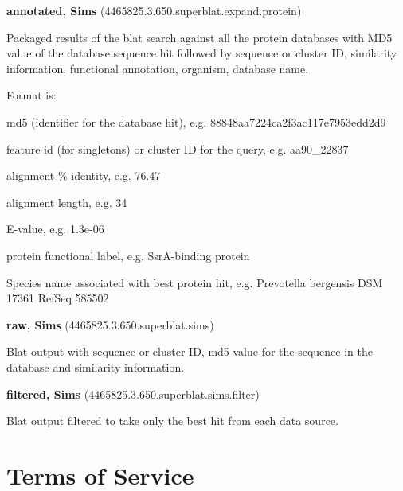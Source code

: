 \documentclass[12pt,fullpage]{report}
\begin{document}
\begin{appendices}
\begin{mdframed}
\textbf{annotated, Sims} (4465825.3.650.superblat.expand.protein)

Packaged results of the blat search against all the protein databases with \gls{MD5} value of the database sequence hit followed by sequence or cluster ID, similarity information, functional annotation, organism, database name.

Format is:

    md5 (identifier for the database hit), e.g. 88848aa7224ca2f3ac117e7953edd2d9

    feature id (for singletons) or cluster ID for the query, e.g. aa90\_22837

    alignment \% identity, e.g. 76.47

    alignment length, e.g. 34

    E-value, e.g. 1.3e-06

    protein functional label, e.g. SsrA-binding protein

    Species name associated with best protein hit, e.g. Prevotella bergensis DSM 17361 RefSeq 585502


\textbf{raw, Sims} (4465825.3.650.superblat.sims)

Blat output with sequence or cluster ID, md5 value for the sequence in the database and similarity information.

\textbf{filtered, Sims} (4465825.3.650.superblat.sims.filter)

Blat output filtered to take only the best hit from each data source.
\end{mdframed}
\chapter{Terms of Service}


\end{appendices}
\end{document}

